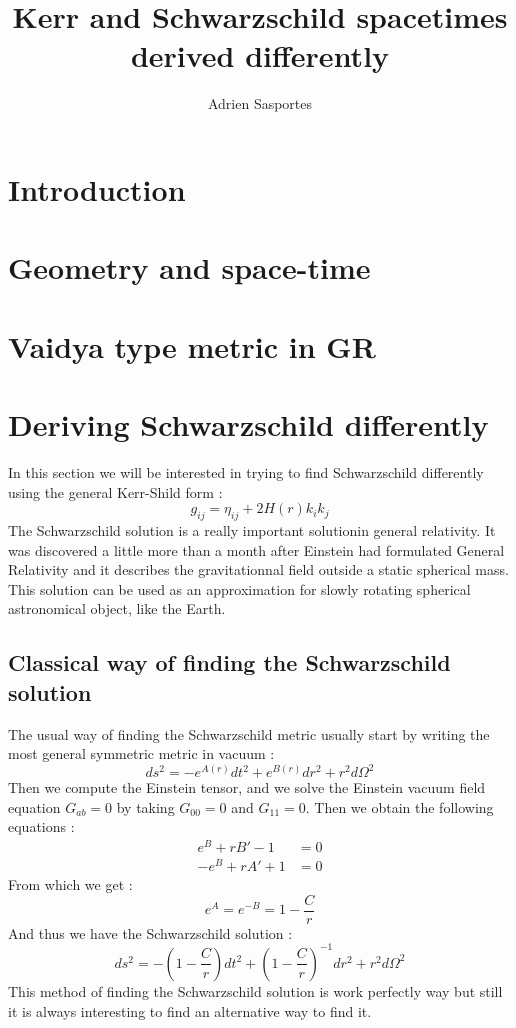 \documentclass[a4paper,12pt]{article}
\title{Kerr and Schwarzschild spacetimes derived differently}
\author{Adrien Sasportes}
\begin{document}
\maketitle
{}

\section{Introduction}

\section{Geometry and space-time}

\section{Vaidya type metric in GR}

\section{Deriving Schwarzschild differently}
In this section we will be interested in trying to find Schwarzschild differently using the general Kerr-Shild form :
\begin{equation*}
	g_{ij}=\eta_{ij}+2H(r)k_ik_j
\end{equation*}
The Schwarzschild solution is a really important solutionin general relativity. It was discovered a little more than a month after Einstein had formulated General Relativity and it describes the gravitationnal field outside a static spherical mass.
This solution can be used as an approximation for slowly rotating spherical astronomical object, like the Earth.
\subsection{Classical way of finding the Schwarzschild solution}
The usual way of finding the Schwarzschild metric usually start by writing the most general symmetric metric in vacuum :
\begin{equation*}
	ds^2=-e^{A(r)}dt^2+e^{B(r)}dr^2+r^2d\Omega^2
\end{equation*}
Then we compute the Einstein tensor, and we solve the Einstein vacuum field equation $G_{ab}=0$ by taking $G_{00}=0$ and $G_{11}=0$. Then we obtain the following equations :
\begin{align*}
	e^B+rB'-1&=0\\
	-e^B+rA'+1&=0
\end{align*}
From which we get :
\begin{equation*}
	e^A=e^{-B}=1-\frac{C}{r}
\end{equation*}
And thus we have the Schwarzschild solution :
\begin{equation*}
	ds^2=-(1-\frac{C}{r})dt^2+(1-\frac{C}{r})^{-1}dr^2+r^2d\Omega^2
\end{equation*}
This method of finding the Schwarzschild solution is work perfectly way but still it is always interesting to find an alternative way to find it.
\end{document}
